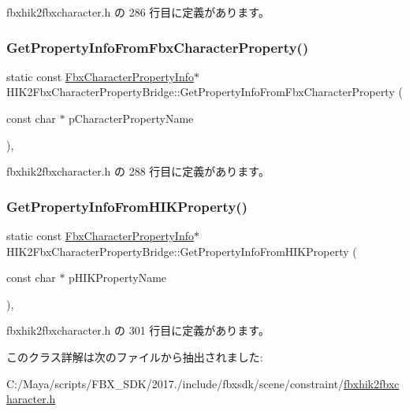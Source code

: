  fbxhik2fbxcharacter.\+h の 286 行目に定義があります。

\mbox{\label{class_h_i_k2_fbx_character_property_bridge_a43ed35a946a91d6face5b189b0f30754}} 
\subsubsection{\texorpdfstring{Get\+Property\+Info\+From\+Fbx\+Character\+Property()}{GetPropertyInfoFromFbxCharacterProperty()}}
{\footnotesize\ttfamily static const \hyperlink{class_fbx_character_property_info}{Fbx\+Character\+Property\+Info}$\ast$ H\+I\+K2\+Fbx\+Character\+Property\+Bridge\+::\+Get\+Property\+Info\+From\+Fbx\+Character\+Property (\begin{DoxyParamCaption}\item[{const char $\ast$}]{p\+Character\+Property\+Name }\end{DoxyParamCaption})\hspace{0.3cm}{\ttfamily [inline]}, {\ttfamily [static]}}



 fbxhik2fbxcharacter.\+h の 288 行目に定義があります。

\mbox{\label{class_h_i_k2_fbx_character_property_bridge_af240d0acf8c1577508d186132ef6011f}} 
\subsubsection{\texorpdfstring{Get\+Property\+Info\+From\+H\+I\+K\+Property()}{GetPropertyInfoFromHIKProperty()}}
{\footnotesize\ttfamily static const \hyperlink{class_fbx_character_property_info}{Fbx\+Character\+Property\+Info}$\ast$ H\+I\+K2\+Fbx\+Character\+Property\+Bridge\+::\+Get\+Property\+Info\+From\+H\+I\+K\+Property (\begin{DoxyParamCaption}\item[{const char $\ast$}]{p\+H\+I\+K\+Property\+Name }\end{DoxyParamCaption})\hspace{0.3cm}{\ttfamily [inline]}, {\ttfamily [static]}}



 fbxhik2fbxcharacter.\+h の 301 行目に定義があります。



このクラス詳解は次のファイルから抽出されました\+:\begin{DoxyCompactItemize}
\item 
C\+:/\+Maya/scripts/\+F\+B\+X\+\_\+\+S\+D\+K/2017./include/fbxsdk/scene/constraint/\hyperlink{fbxhik2fbxcharacter_8h}{fbxhik2fbxcharacter.\+h}\end{DoxyCompactItemize}
